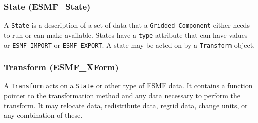 \subsubsection{State (ESMF\_State)}
A {\tt State} is a description of a set of data that a 
{\tt Gridded Component} either needs to run or can make available.  States
have a {\tt type} attribute that can have values or {\tt ESMF\_IMPORT} or
{\tt ESMF\_EXPORT}.  A state may be acted on by a {\tt Transform} object.

\subsubsection{Transform (ESMF\_XForm)} 
A {\tt Transform} acts on a {\tt State} or other type of 
ESMF data.  It contains a function pointer to the transformation method 
and any data necessary to perform the transform.  It may relocate data, 
redistribute data, regrid data, change units, or any combination of these.  









